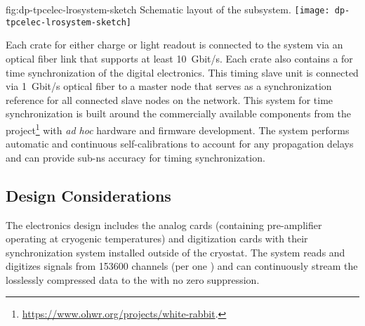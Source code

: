 \begin{dunefigure}{fig:dp-tpcelec-lrosystem-sketch}
{Schematic layout of the   subsystem.}
\texttt{[image: dp-tpcelec-lrosystem-sketch]}
\end{dunefigure}

Each  crate for either charge or light readout is connected to the  system via an optical fiber link that supports at least \SI{10}{Gbit/s}. Each crate also contains a  for time synchronization of the digital electronics. This timing slave unit is connected via \SI{1}{Gbit/s} optical fiber to a master node that serves as a synchronization reference for all connected slave nodes on the network. This system for time synchronization is built around the commercially available components from the  project\footnote{\url{https://www.ohwr.org/projects/white-rabbit}.} with \textit{ad hoc} hardware and firmware development. The system performs automatic and continuous self-calibrations to account for any propagation delays and can provide sub-\si{\nano\s} accuracy for timing synchronization.



\subsection{Design Considerations}
\label{ssec:dp-tpcelec-requir}

The  electronics design includes the analog  cards (containing pre-amplifier  operating at cryogenic temperatures) and digitization cards with their synchronization system installed outside of the cryostat. The system reads and digitizes signals from \num{153600} channels (per one )  and can continuously stream the losslessly compressed data to the  with no zero suppression. 

